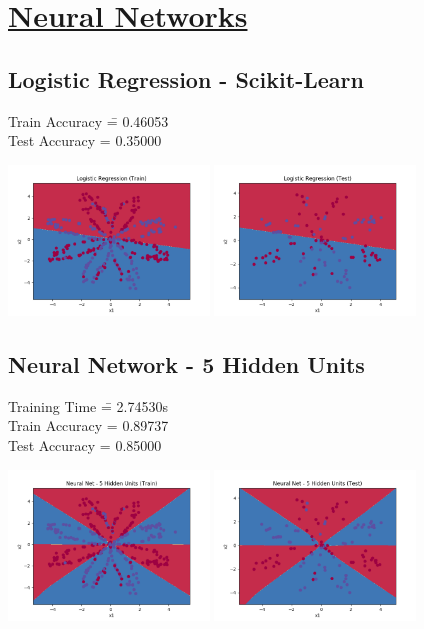 \documentclass[12pt]{article}
\begin{document}
\newpage
\section*{\underline{Neural Networks}}
\subsection*{Logistic Regression - Scikit-Learn}
\begin{addmargin}[0.3in]{0in}
\begin{tabbing}
Train Accuracy \= = 0.46053 \\
Test Accuracy \> = 0.35000
\end{tabbing}
\end{addmargin}
\includegraphics[width=0.4\textwidth]{log1.png}
\includegraphics[width=0.4\textwidth]{log2.png}
\subsection*{Neural Network - 5 Hidden Units}
\begin{addmargin}[0.3in]{0in}
\begin{tabbing}
Training Time \quad \= = 2.74530s \\
Train Accuracy \> = 0.89737 \\
Test Accuracy \> = 0.85000
\end{tabbing}
\end{addmargin}
\includegraphics[width=0.4\textwidth]{nn1.png}
\includegraphics[width=0.4\textwidth]{nn2.png}
\end{document}
